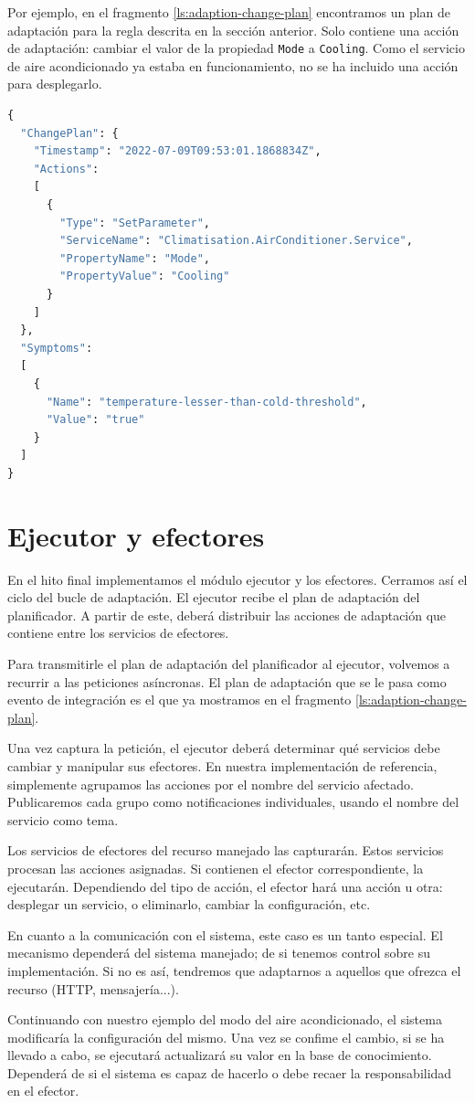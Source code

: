 Por ejemplo, en el fragmento \ref{ls:adaption-change-plan} encontramos un plan de adaptación para la regla descrita en la sección anterior. Solo contiene una acción de adaptación: cambiar el valor de la propiedad \texttt{Mode} a \texttt{Cooling}. Como el servicio de aire acondicionado ya estaba en funcionamiento, no se ha incluido una acción para desplegarlo.

\begin{lstlisting}[language=python,caption={Plan de adaptación generado para la regla anterior. Solo contiene una acción de adaptación: cambiar la configuración \texttt{Mode} del servicio \texttt{AirConditioner}.},captionpos=b, label=ls:adaption-change-plan]
{
  "ChangePlan": {
    "Timestamp": "2022-07-09T09:53:01.1868834Z",
    "Actions":
    [
      {
        "Type": "SetParameter",
        "ServiceName": "Climatisation.AirConditioner.Service",
        "PropertyName": "Mode",
        "PropertyValue": "Cooling"
      }
    ]
  },
  "Symptoms":
  [
    {
      "Name": "temperature-lesser-than-cold-threshold",
      "Value": "true"
    }
  ]
}
\end{lstlisting}

\section{Ejecutor y efectores}

En el hito final implementamos el módulo ejecutor y los efectores. Cerramos así el ciclo del bucle de adaptación. El ejecutor recibe el plan de adaptación del planificador. A partir de este, deberá distribuir las acciones de adaptación que contiene entre los servicios de efectores.

Para transmitirle el plan de adaptación del planificador al ejecutor, volvemos a recurrir a las peticiones asíncronas. El plan de adaptación que se le pasa como evento de integración es el que ya mostramos en el fragmento \ref{ls:adaption-change-plan}.

Una vez captura la petición, el ejecutor deberá determinar qué servicios debe cambiar y manipular sus efectores. En nuestra implementación de referencia, simplemente agrupamos las acciones por el nombre del servicio afectado. Publicaremos cada grupo como notificaciones individuales, usando el nombre del servicio como tema.

Los servicios de efectores del recurso manejado las capturarán. Estos servicios procesan las acciones asignadas. Si contienen el efector correspondiente, la ejecutarán. Dependiendo del tipo de acción, el efector hará una acción u otra: desplegar un servicio, o eliminarlo, cambiar la configuración, etc.

En cuanto a la comunicación con el sistema, este caso es un tanto especial. El mecanismo dependerá del sistema manejado; de si tenemos control sobre su implementación. Si no es así, tendremos que adaptarnos a aquellos que ofrezca el recurso (HTTP, mensajería...).

Continuando con nuestro ejemplo del modo del aire acondicionado, el sistema modificaría la configuración del mismo. Una vez se confime el cambio, si se ha llevado a cabo, se ejecutará actualizará su valor en la base de conocimiento. Dependerá de si el sistema es capaz de hacerlo o debe recaer la responsabilidad en el efector.
